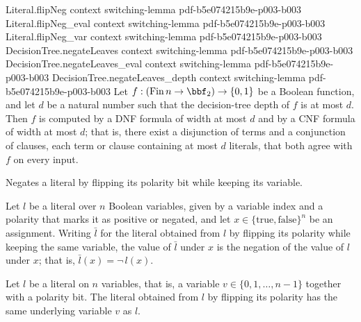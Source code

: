 \begin{lemma}
\proofstep
  {Literal.flipNeg}
  {context}
  {switching-lemma}
  {pdf-b5e074215b9e-p003-b003}
\proofstep
  {Literal.flipNeg_eval}
  {context}
  {switching-lemma}
  {pdf-b5e074215b9e-p003-b003}
\proofstep
  {Literal.flipNeg_var}
  {context}
  {switching-lemma}
  {pdf-b5e074215b9e-p003-b003}
\proofstep
  {DecisionTree.negateLeaves}
  {context}
  {switching-lemma}
  {pdf-b5e074215b9e-p003-b003}
\proofstep
  {DecisionTree.negateLeaves_eval}
  {context}
  {switching-lemma}
  {pdf-b5e074215b9e-p003-b003}
\proofstep
  {DecisionTree.negateLeaves_depth}
  {context}
  {switching-lemma}
  {pdf-b5e074215b9e-p003-b003}
Let $f : (\mathrm{Fin}\,n \to \bbf_2) \to \{0,1\}$ be a Boolean function, and let $d$ be
a natural number such that the decision-tree depth of $f$ is at most $d$. Then $f$ is
computed by a DNF formula of width at most $d$ and by a CNF formula of width at most
$d$; that is, there exist a disjunction of terms and a conjunction of clauses, each term
or clause containing at most $d$ literals, that both agree with $f$ on every input.
\end{lemma}

\begin{definition}
\label{Literal.flipNeg}
\leanok
{}
Negates a literal by flipping its polarity bit while keeping its variable.
\end{definition}

\begin{lemma}
\label{Literal.flipNeg_eval}
\leanok
{}
Let $l$ be a literal over $n$ Boolean variables, given by a variable index and a
polarity that marks it as positive or negated, and let $x \in
\{\text{true},\text{false}\}^n$ be an assignment. Writing $\bar{l}$ for the literal
obtained from $l$ by flipping its polarity while keeping the same variable, the value of
$\bar{l}$ under $x$ is the negation of the value of $l$ under $x$; that is, $\bar{l}(x)
= \lnot\, l(x)$.
\end{lemma}

\begin{lemma}
\label{Literal.flipNeg_var}
\leanok
{}
Let $l$ be a literal on $n$ variables, that is, a variable $v \in \{0,1,\dots,n-1\}$
together with a polarity bit. The literal obtained from $l$ by flipping its polarity has
the same underlying variable $v$ as $l$.
\end{lemma}

